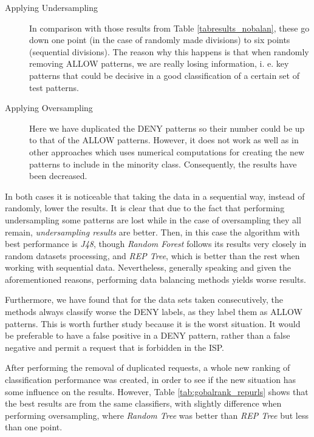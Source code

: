 \documentclass{llncs}
\begin{document}
\begin{description}
  \item[Applying Undersampling] In comparison with those results from Table \ref{tabresults_nobalan}, these go down one point (in the case of randomly made divisions) to six points (sequential divisions). The reason why this happens is that when randomly removing ALLOW patterns, we are really losing information, i. e. key patterns that could be decisive in a good classification of a certain set of test patterns. 
  \item[Applying Oversampling] Here we have duplicated the DENY patterns so their number could be up to that of the ALLOW patterns. However, it does not work as well as in other approaches which uses numerical computations for creating the new patterns to include in the minority class. Consequently, the results have been decreased.
\end{description}

In both cases it is noticeable that taking the data in a sequential way, instead of randomly, lower the results. It is clear that due to the fact that performing undersampling some patterns are lost while in the case of oversampling they all remain, \textit{undersampling results} are better. Then, in this case the algorithm with best performance is \textit{J48}, though \textit{Random Forest} follows its results very closely in random datasets processing, and \textit{REP Tree}, which is better than the rest when working with sequential data. Nevertheless, generally speaking and given the aforementioned reasons, performing data balancing methods yields worse results.

Furthermore, we have found that for the data sets taken consecutively, the methods always classify worse the DENY labels, as they label them as ALLOW patterns. This is worth further study because it is the worst situation. It would be preferable to have a false positive in a DENY pattern, rather than a false negative and permit a request that is forbidden in the ISP.


After performing the removal of duplicated requests, a whole new ranking of classification performance was created, in order to see if the new situation has some influence on the results. However, Table  \ref{tab:gobalrank_repurls} shows that the best results are from the same classifiers, with slightly difference when performing oversampling, where \textit{Random Tree} was better than \textit{REP Tree} but less than one point.
\end{document}
